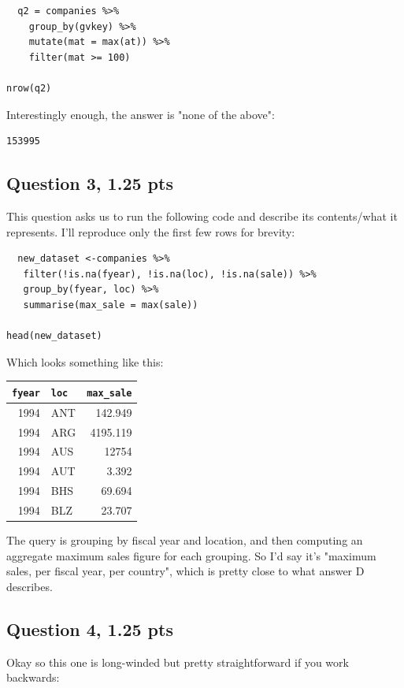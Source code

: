 \documentclass[11pt]{article}
\begin{document}
\begin{verbatim}
  q2 = companies %>%
    group_by(gvkey) %>%
    mutate(mat = max(at)) %>%
    filter(mat >= 100)

nrow(q2)
\end{verbatim}

Interestingly enough, the answer is "none of the above":

\begin{verbatim}
153995
\end{verbatim}

\subsection*{Question 3, 1.25 pts}
\label{sec:org5464515}
This question asks us to run the following code and describe its contents/what it represents.  I'll reproduce only the first few rows for brevity:

\begin{verbatim}
  new_dataset <-companies %>%
   filter(!is.na(fyear), !is.na(loc), !is.na(sale)) %>%
   group_by(fyear, loc) %>%
   summarise(max_sale = max(sale))

head(new_dataset)
\end{verbatim}

Which looks something like this:

\begin{center}
\begin{tabular}{rlr}
\texttt{fyear} & \texttt{loc} & \texttt{max\_sale}\\[0pt]
\hline
1994 & ANT & 142.949\\[0pt]
1994 & ARG & 4195.119\\[0pt]
1994 & AUS & 12754\\[0pt]
1994 & AUT & 3.392\\[0pt]
1994 & BHS & 69.694\\[0pt]
1994 & BLZ & 23.707\\[0pt]
\end{tabular}
\end{center}

The query is grouping by fiscal year and location, and then computing an aggregate maximum sales figure for each grouping.  So I'd say it's "maximum sales, per fiscal year, per country", which is pretty close to what answer D describes.

\subsection*{Question 4, 1.25 pts}
\label{sec:orgee16427}
Okay so this one is long-winded but pretty straightforward if you work backwards:
\end{document}
